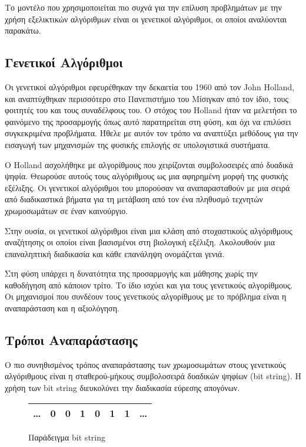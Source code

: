 Το μοντέλο που χρησιμοποιείται πιο συχνά για την επίλυση προβλημάτων με την χρήση εξελικτικών αλγόριθμων είναι οι γενετικοί αλγόριθμοι, οι οποίοι αναλύονται παρακάτω.

\subsection{Γενετικοί Αλγόριθμοι}

Οι γενετικοί αλγόριθμοι εφευρέθηκαν την δεκαετία του 1960 από τον John Holland, και αναπτύχθηκαν περισσότερο στο Πανεπιστήμιο του Μίσιγκαν από τον ίδιο, τους φοιτητές του και τους συναδέλφους του. Ο στόχος του Holland ήταν να μελετήσει το φαινόμενο της προσαρμογής όπως αυτό παρατηρείται στη φύση, και όχι να επιλύσει συγκεκριμένα προβλήματα. Ήθελε με αυτόν τον τρόπο να αναπτύξει μεθόδους για την εισαγωγή των μηχανισμών της φυσικής επιλογής σε υπολογιστικά συστήματα. \cite{Melanie1999}

O Holland ασχολήθηκε με αλγορίθμους που χειρίζονται συμβολοσειρές από δυαδικά ψηφία. Θεωρούσε αυτούς τους αλγόριθμους ως μια αφηρημένη μορφή της φυσικής εξέλιξης. Οι γενετικοί αλγόριθμοι του μπορούσαν να αναπαρασταθούν με μια σειρά από διαδικαστικά βήματα για τη μετάβαση από τον ένα πληθυσμό τεχνητών χρωμοσωμάτων σε έναν καινούργιο. \cite{Negnevitsky2005}

Στην ουσία, οι γενετικοί αλγόριθμοι είναι μια κλάση από στοχαστικούς αλγόριθμους αναζήτησης οι οποίοι είναι βασισμένοι στη βιολογική εξέλιξη. Ακολουθούν μια επαναληπτική διαδικασία και κάθε επανάληψη ονομάζεται γενιά.

Στη φύση υπάρχει η δυνατότητα της προσαρμογής και μάθησης χωρίς την καθοδήγηση από κάποιον τρίτο. Το ίδιο ισχύει και για τους γενετικούς αλγορίθμους. Οι μηχανισμοί που συνδέουν τους γενετικούς αλγορίθμους με το πρόβλημα είναι η αναπαράσταση και η αξιολόγηση.

\subsection{Τρόποι Αναπαράστασης}

Ο πιο συνηθισμένος τρόπος αναπαράστασης των χρωμοσωμάτων στους γενετικούς αλγόριθμους είναι η σταθερού-μήκους συμβολοσειρά δυαδικών ψηφίων (bit string). Η χρήση των bit string διευκολύνει την διαδικασία εύρεσης απογόνων.

\begin{figure}[!t]
    \renewcommand{\arraystretch}{1.3}
    \label{fig_bit_string}
    \centering
    \begin{tabular}{c|c|c|c|c|c|c|c}
        \hline
        \ldots & 0 & 0 & 1 & 0 & 1 & 1 & \ldots\\
        \hline
    \end{tabular}
    \caption{Παράδειγμα bit string}
\end{figure}

